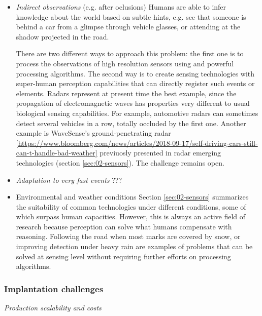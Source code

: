 \begin{itemize}
    \item \emph{Indirect observations} (e.g. after oclusions)
        Humans are able to infer knowledge about the world based on subtle 
        hints, e.g. see that someone is behind a car from a glimpse through
        vehicle glasses, or attending at the shadow projected in the road. 
        
        There are two different ways to approach this problem:
        the first one is to process the observations of high resolution sensors 
        using and powerful processing algorithms. 
        The second way is to create 
        sensing technologies with super-human perception capabilities that can 
        directly register such events or elements. 
        Radars represent at present time the best example, since the propagation
        of electromagnetic waves has properties very different to usual 
        biological sensing capabilities. For example, automotive radars can 
        sometimes detect several vehicles in a row, totally occluded by the 
        first one. Another example is WaveSense's ground-penetrating radar 
        \ref{https://www.bloomberg.com/news/articles/2018-09-17/self-driving-cars-still-can-t-handle-bad-weather}
        previuosly presented in radar emerging technologies (section 
        \ref{sec:02-sensors}). The challenge remains open.
    
    \item \emph{Adaptation to very fast events} ???
    
    \item {Environmental and weather conditions}    
        Section \ref{sec:02-sensors} summarizes the suitability of common 
        technologies under different conditions, some of which surpass human 
        capacities. 
        However, this is always an active field of research because perception 
        can solve what humans compensate with reasoning. Following the road 
        when most marks are covered by snow, or improving detection under heavy 
        rain are examples of problems that can be solved at sensing level
        without requiring further efforts on processing algorithms.
    
\end{itemize}


\subsubsection{Implantation challenges}


\emph{Production scalability and costs}

